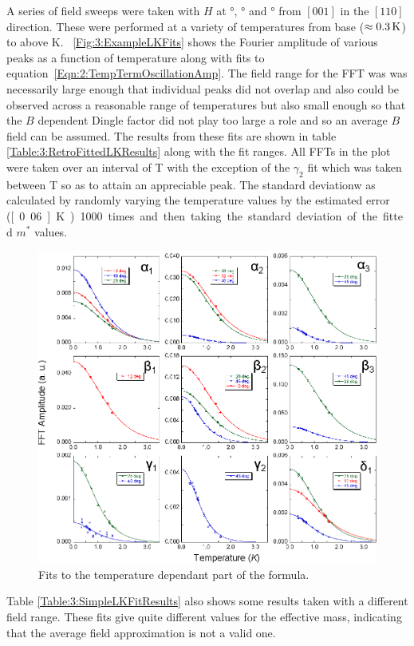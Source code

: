 A series of field sweeps were taken with $H$ at \unit[12]{\degree}, \unit[28]{\degree} and \unit[46]{\degree} from $[001]$ in the $[110]$ direction. These were performed at a variety of temperatures from base ($\approx\unit[0.3]{K}$) to above \unit[2]{K}. \Fig~\ref{Fig:3:ExampleLKFits} shows the Fourier amplitude of various peaks as a function of temperature along with fits to equation~\ref{Eqn:2:TempTermOscillationAmp}. The field range for the FFT was was necessarily large enough that individual peaks did not overlap and also could be observed across a reasonable range of temperatures but also small enough so that the $B$ dependent Dingle factor did not play too large a role and so an average $B$ field can be assumed. The results from these fits are shown in table \ref{Table:3:RetroFittedLKResults} along with the fit ranges. All FFTs in the plot were taken over an interval of \unit[12--18]{T} with the exception of the $\gamma_2$ fit which was taken between \unit[16-18]{T} so as to attain an appreciable peak. The standard deviationw as calculated by randomly varying the temperature values by the estimated error (\unit[0.06]{K}) 1000 times and then taking the standard deviation of the fitted $m^*$ values.
\begin{figure}[htbp]
    \begin{center}
        \includegraphics[scale=0.9]{Chapter3-dHvABaFe2P2/Figures/Mass/SimpleLKFits/SimpleLKFits}
        \caption{Fits to the temperature dependant part of the \LK formula. }
        \label{Fig:3:SimpleLKFits}
    \end{center}
\end{figure}
Table \ref{Table:3:SimpleLKFitResults} also shows some results taken with a different field range. These fits give quite different values for the effective mass, indicating that the average field approximation is not a valid one.

